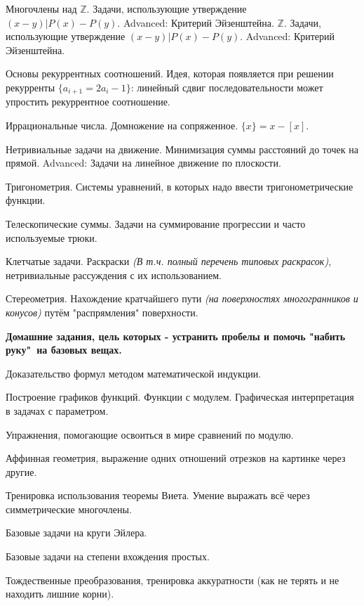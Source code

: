 \documentclass[12pt, a4paper]{article}
\begin{document}
\ii Многочлены над $\mathbb{Z}$. Задачи, использующие утверждение $(x-y) | P(x)-P(y)$. Advanced: Критерий Эйзенштейна.
$\mathbb{Z}$. Задачи, использующие утверждение $(x-y) | P(x)-P(y)$. Advanced: Критерий Эйзенштейна.

\ii Основы рекуррентных соотношений. Идея, которая появляется при решении рекурренты $\{ a_{i+1}=2a_i-1 \}$: линейный сдвиг последовательности может упростить рекуррентное соотношение.

\ii Иррациональные числа. Домножение на сопряженное. $\{ x \} = x - [x]$.

\ii Нетривиальные задачи на движение. Минимизация суммы расстояний до точек на прямой. Advanced: Задачи на линейное движение по плоскости.

\ii Тригонометрия. Системы уравнений, в которых надо ввести тригонометрические функции.

\ii Телескопические суммы. Задачи на суммирование прогрессии и часто используемые трюки.

\ii Клетчатые задачи. Раскраски \textit{(В т.ч. полный перечень типовых раскрасок)}, нетривиальные рассуждения с их использованием.

\ii Стереометрия. Нахождение кратчайшего пути \textit{(на поверхностях многогранников и конусов)} путём "распрямления" поверхности.

\newpage

\begin{center}
\textbf{
	Домашние задания, цель которых - устранить пробелы и помочь "набить руку"\ на базовых вещах.
}
\end{center}

\setcounter{iii}{0}

\ii Доказательство формул методом математической индукции.

\ii Построение графиков функций. Функции с модулем. Графическая интерпретация в задачах с параметром.

\ii Упражнения, помогающие освоиться в мире сравнений по модулю.

\ii Аффинная геометрия, выражение одних отношений отрезков на картинке через другие.

\ii Тренировка использования теоремы Виета. Умение выражать всё через симметрические многочлены.

\ii Базовые задачи на круги Эйлера.

\ii Базовые задачи на степени вхождения простых.

\ii Тождественные преобразования, тренировка аккуратности (как не терять и не находить лишние корни).
\end{document}
